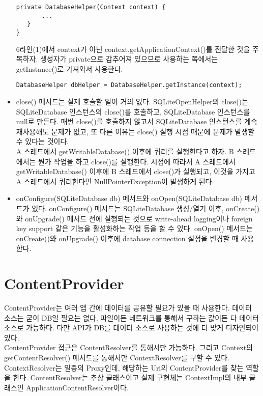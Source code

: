 \begin{itemize}
\begin{lstlisting}[frame=single]
   private DatabaseHelper(Context context) {
       ...
   }
}
\end{lstlisting}
6라인(1)에서 context가 아닌 context.getApplicationContext()를 전달한 것을 주목하자.
생성자가 private으로 감추어져 있으므로 사용하는 쪽에서는 getInstance()로 가져와서 사용한다.
\begin{lstlisting}[frame=single] 
	DatabaseHelper dbHelper = DatabaseHelper.getInstance(context);
\end{lstlisting}

\item close() 메서드는 실제 호출할 일이 거의 없다.
SQLiteOpenHelper의 close()는 SQLiteDatabase 인스턴스의 close()를 호출하고, SQLiteDatabase 인스턴스를 null로 만든다. 
매번 close()를 호출하지 않고서 SQLiteDatabase 인스턴스를 계속 재사용해도 문제가 없고, 또 다른 이유는 close() 실행 시점 때문에 문제가 발생할 수 있다는 것이다.\\

A 스레드에서 getWritableDatabase() 이후에 쿼리를 실행한다고 하자. B 스레드에서는 뭔가 작업을 하고 close()를 실행한다. 시점에 따라서 A 스레드에서 getWritableDatabase() 이후에 B 스레드에서 close()가 실행되고, 이것을 가지고 A 스레드에서 쿼리한다면  NullPointerException이 발생하게 된다. 
\item onConfigure(SQLiteDatabase db) 메서드와 onOpen(SQLiteDatabase db) 메서드가 있다. onConfigure() 메서드는 SQLiteDatabase 생성/열기 이후, onCreate()와 onUpgrade() 메서드 전에 실행되는 것으로 write-ahead logging이나 foreign key support 같은 기능을 활성화하는 작업 등을 할 수 있다. onOpen() 메서드는 onCreate()와 onUpgrade() 이후에 database connection 설정을 변경할 때 사용한다.

\end{itemize}

\section{ContentProvider}
ContentProvider는 여러 앱 간에 데이터를 공유할 필요가 있을 때 사용한다. 데이터 소스는 굳이 DB일 필요는 없다. 
파일이든 네트워크를 통해서 구하는 값이든 다 데이터 소스로 가능하다. 다만 API가 DB를 데이터 소스로 사용하는 것에 더 맞게 디자인되어 있다.\\

ContentProvider 접근은 ContentResolver를 통해서만 가능하다. 그리고 Context의 getContentResolver() 메서드를 통해서만 ContextResolver를 구할 수 있다.  
ContextResolver는 일종의 Proxy인데, 해당하는 Uri의 ContentProvider를 찾는 역할을 한다.
ContentResolver는 추상 클래스이고 실제 구현체는 ContextImpl의 내부 클래스인 ApplicationContentResolver이다.

